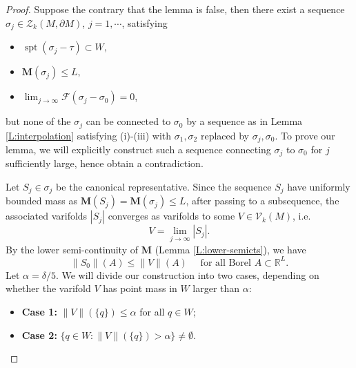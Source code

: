 \documentclass[10pt]{amsart}
\theoremstyle{definition}
\theoremstyle{remark}
\numberwithin{equation}{section}
\newcommand{\al}{\alpha}
\newcommand{\V}{\mathcal{V}}
\newcommand{\R}{\mathbb{R}}
\newcommand{\F}{\mathcal{F}}
\newcommand{\si}{\sigma}
\newcommand{\de}{\delta}
\newcommand{\Z}{\mathcal{Z}}
\newcommand{\M}{\mathbf{M}}
\newcommand{\spt}{\operatorname{spt}}
\begin{document}
\begin{proof}
Suppose the contrary that the lemma is false, then there exist a sequence $\si_j\in\Z_k(M, \partial M)$, $j=1,\cdots$, satisfying
\begin{itemize}
\item $\spt(\si_j-\tau)\subset W,$
\item $\M(\si_j)\leq L,$
\item $\lim_{j\rightarrow\infty} \F(\si_j - \si_0)=0$,
\end{itemize}
but none of the $\si_j$ can be connected to $\si_0$ by a sequence as in Lemma \ref{L:interpolation} satisfying (i)-(iii) with $\si_1, \si_2$ replaced by $\si_j, \si_0$. To prove our lemma, we will explicitly construct such a sequence connecting $\si_j$ to $\si_0$ for $j$ sufficiently large, hence obtain a contradiction.

Let $S_j \in \si_j$ be the canonical representative. Since the sequence $S_j$ have uniformly bounded mass as $\M(S_j)=\M(\si_j) \leq L$, after passing to a subsequence, the associated varifolds $|S_j|$ converges as varifolds to some $V \in \V_k(M)$, i.e.
\[ V=\lim_{j\rightarrow\infty}|S_j|. \]
By the lower semi-continuity of $\M$ (Lemma \ref{L:lower-semicts}), we have
\begin{equation}
\label{E:S_0-V}
\|S_0\| (A) \leq \|V\| (A) \quad \text{ for all Borel $A \subset \R^L$}. 
\end{equation}
Let $\al=\de/5$. We will divide our construction into two cases, depending on whether the varifold $V$ has point mass in $W$ larger than $\al$:
\begin{itemize}
\item {\bf Case 1:} $\|V\|(\{q\})\leq \al$ for all $q\in W$;
\item {\bf Case 2:} $\{q\in W: \|V\|(\{q\})> \al\}\neq \emptyset$.
\end{itemize}


\end{proof}
\end{document}
